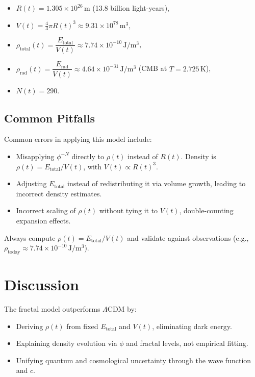 \documentclass[12pt,a4paper]{article}
\begin{document}
\begin{itemize}
  \item \(R(t) = 1.305 \times 10^{26}\,\mathrm{m}\) (13.8 billion light-years),
  \item \(V(t) = \frac{4}{3}\pi R(t)^3 \approx 9.31 \times 10^{78}\,\mathrm{m^3}\),
  \item \(\rho_{\mathrm{total}}(t) = \dfrac{E_{\mathrm{total}}}{V(t)} \approx 7.74 \times 10^{-10}\,\mathrm{J/m^3}\),
  \item \(\rho_{\mathrm{rad}}(t) = \dfrac{E_{\mathrm{rad}}}{V(t)} \approx 4.64 \times 10^{-31}\,\mathrm{J/m^3}\) (CMB at \(T = 2.725\,\mathrm{K}\)),
  \item \(N(t) = 290\).
\end{itemize}

\subsection{Common Pitfalls}

Common errors in applying this model include:

\begin{itemize}
  \item Misapplying \(\phi^{-N}\) directly to \(\rho(t)\) instead of \(R(t)\). Density is \(\rho(t) = E_{\mathrm{total}}/V(t)\), with \(V(t) \propto R(t)^3\).
  \item Adjusting \(E_{\mathrm{total}}\) instead of redistributing it via volume growth, leading to incorrect density estimates.
  \item Incorrect scaling of \(\rho(t)\) without tying it to \(V(t)\), double-counting expansion effects.
\end{itemize}

Always compute \(\rho(t) = E_{\mathrm{total}}/V(t)\) and validate against observations (e.g., \(\rho_{\text{today}} \approx 7.74 \times 10^{-10}\,\mathrm{J/m^3}\)).

\section{Discussion}

The fractal model outperforms \(\Lambda\)CDM by:

\begin{itemize}
  \item Deriving \(\rho(t)\) from fixed \(E_{\mathrm{total}}\) and \(V(t)\), eliminating dark energy.
  \item Explaining density evolution via \(\phi\) and fractal levels, not empirical fitting.
  \item Unifying quantum and cosmological uncertainty through the wave function and \(c\).
\end{itemize}
\end{document}
